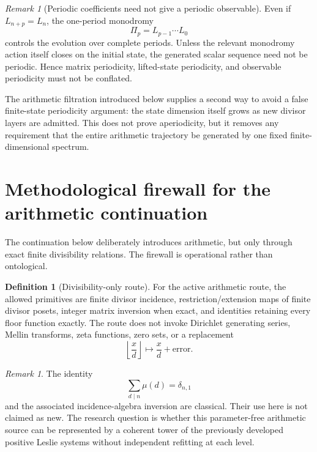 \documentclass[11pt]{amsart}
\numberwithin{equation}{section}
\theoremstyle{plain}
\theoremstyle{definition}
\newtheorem{definition}[theorem]{Definition}
\theoremstyle{remark}
\newtheorem{remark}[theorem]{Remark}
\begin{document}
\begin{remark}[Periodic coefficients need not give a periodic observable]
\label{rem:periodic_coeff_not_signal}
Even if $L_{n+p}=L_n$, the one-period monodromy
\[
\Pi_p=L_{p-1}\cdots L_0
\]
controls the evolution over complete periods.  Unless the relevant monodromy action itself closes
on the initial state, the generated scalar sequence need not be periodic.  Hence matrix
periodicity, lifted-state periodicity, and observable periodicity must not be conflated.
\end{remark}

The arithmetic filtration introduced below supplies a second way to avoid a false finite-state
periodicity argument: the state dimension itself grows as new divisor layers are admitted.  This
does not prove aperiodicity, but it removes any requirement that the entire arithmetic trajectory
be generated by one fixed finite-dimensional spectrum.


\section{Methodological firewall for the arithmetic continuation}
\label{sec:arithmetic_firewall}

The continuation below deliberately introduces arithmetic, but only through exact finite
divisibility relations.  The firewall is operational rather than ontological.

\begin{definition}[Divisibility-only route]
\label{def:divisibility_only_route}
For the active arithmetic route, the allowed primitives are finite divisor incidence,
restriction/extension maps of finite divisor posets, integer matrix inversion when exact, and
identities retaining every floor function exactly.  The route does not invoke Dirichlet
generating series, Mellin transforms, zeta functions, zero sets, or a replacement
\[
\left\lfloor\frac xd\right\rfloor\mapsto\frac xd+\text{error}.
\]
\end{definition}

\begin{remark}
\label{rem:classical_origin_declared}
The identity
\[
\sum_{d\mid n}\mu(d)=\delta_{n,1}
\]
and the associated incidence-algebra inversion are classical.  Their use here is not claimed as
new.  The research question is whether this parameter-free arithmetic source can be represented
by a coherent tower of the previously developed positive Leslie systems without independent
refitting at each level.
\end{remark}
\end{document}
